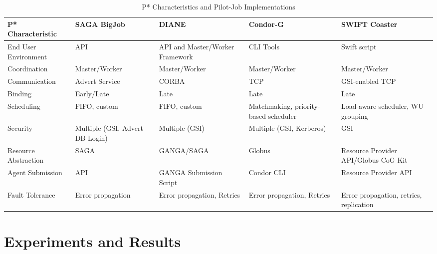 \documentclass[conference,final]{IEEEtran}
\newcommand{\up}{\vspace*{-1em}}
\newcommand{\upp}{\vspace*{-0.5em}}
\begin{document}
\begin{table}[t]
\centering
\begin{tabular}{|l|p{2.5cm}|p{2.5cm}|p{2.5cm}|p{2.5cm}|}
	\hline
	\textbf{P* Characteristic}
	&\textbf{SAGA BigJob} &\textbf{DIANE} &\textbf{Condor-G} &   
	\textbf{SWIFT Coaster} \\ \hline
End User Environment &API &API and Master/Worker Framework &CLI Tools &Swift script\\ \hline

Coordination &Master/Worker  &Master/Worker  &Master/Worker &Master/Worker \\ \hline
	
Communication &Advert Service &CORBA &TCP &GSI-enabled TCP \\ \hline

Binding &Early/Late &Late &Late &Late\\
\hline
Scheduling &FIFO, custom &FIFO, custom &Matchmaking, priority-based scheduler 
&Load-aware scheduler, WU grouping\\
\hline

Security &Multiple (GSI, Advert DB Login) &Multiple (GSI) &Multiple (GSI, 
Kerberos) &GSI\\ \hline

Resource Abstraction &SAGA &GANGA/SAGA &Globus &Resource Provider API/Globus CoG 
Kit \\ 
\hline
Agent Submission &API &GANGA Submission Script &Condor CLI 
&Resource Provider API\\
\hline
Fault Tolerance &Error propagation &Error propagation, Retries &Error propagation, Retries &Error propagation, retries, replication\\
\hline
	
\end{tabular}
\caption{P* Characteristics and Pilot-Job Implementations\up}\label{table:pilot-job-comparison}
\end{table}

\upp
\section{Experiments and Results\upp\upp}
\end{document}
